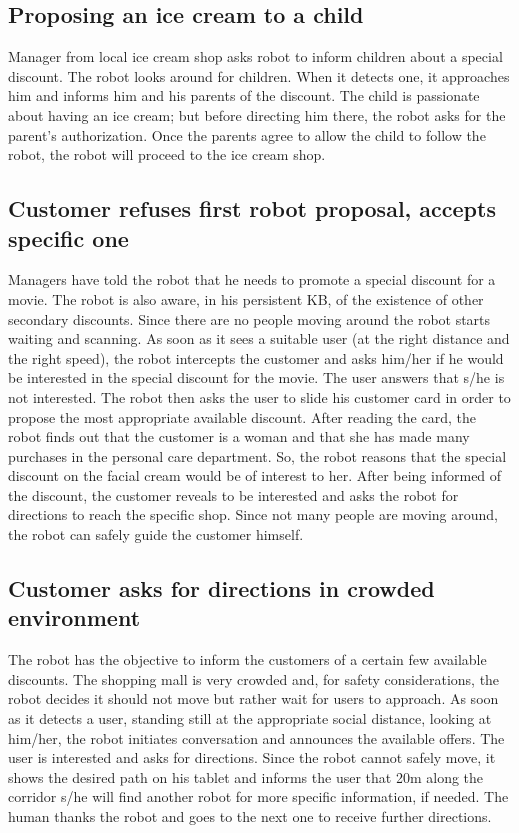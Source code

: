 \subsection{Proposing an ice cream to a child}

Manager from local ice cream shop asks robot to inform children about
a special discount. The robot looks around for children. When it detects
one, it approaches him and informs him and his parents of the discount. The child
is passionate about having an ice cream; but before directing him
there, the robot asks for the parent's authorization. Once the parents
agree to allow the child to follow the robot, the robot will proceed
to the ice cream shop. 


\subsection{Customer refuses first robot proposal, accepts specific one}

Managers have told the robot that he needs to promote a special discount
for a movie. The robot is also aware, in his persistent KB, of the
existence of other secondary discounts. Since there are no people
moving around the robot starts waiting and scanning. As soon as it
sees a suitable user (at the right distance and the right speed),
the robot intercepts the customer and asks him/her if he would be interested
in the special discount for the movie. The user answers that s/he is not interested.
The robot then asks the user to slide his customer card in order to
propose the most appropriate available discount. After reading the
card, the robot finds out that the customer is a woman and that she
has made many purchases in the personal care department. 
So, the robot reasons that the special discount on the facial cream would be of interest
to her. After being informed of the discount, the customer reveals
to be interested and asks the robot for directions to reach the specific
shop. Since not many people are moving around, the robot can safely
guide the customer himself.


\subsection{Customer asks for directions in crowded environment}

The robot has the objective to inform the customers of a certain few
available discounts. The shopping mall is very crowded and, for safety
considerations, the robot decides it should not move but rather wait
for users to approach. As soon as it detects a user, standing still at
the appropriate social distance, looking at him/her, the robot initiates
conversation and announces the available offers. The user is interested
and asks for directions. Since the robot cannot safely move, it shows
the desired path on his tablet and informs the user that 20m along
the corridor s/he will find another robot for more specific information,
if needed. The human thanks the robot and goes to the next one to
receive further directions.
